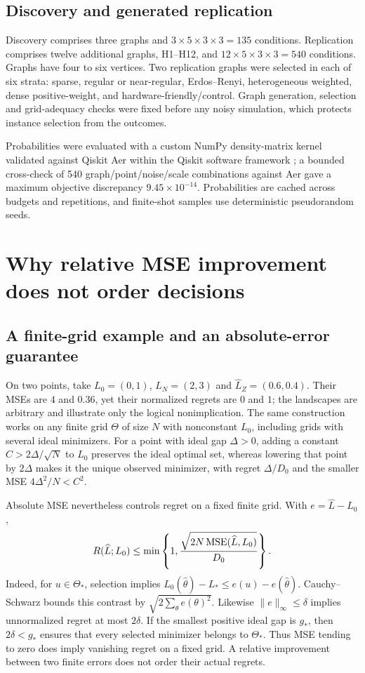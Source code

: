 \subsection{Discovery and generated replication}
Discovery comprises three graphs and $3\times5\times3\times3=135$ conditions. Replication comprises twelve additional graphs, H1--H12, and $12\times5\times3\times3=540$ conditions. Graphs have four to six vertices. Two replication graphs were selected in each of six strata: sparse, regular or near-regular, Erdos--Renyi, heterogeneous weighted, dense positive-weight, and hardware-friendly/control. Graph generation, selection and grid-adequacy checks were fixed before any noisy simulation, which protects instance selection from the outcomes.

Probabilities were evaluated with a custom NumPy density-matrix kernel validated against Qiskit Aer within the Qiskit software framework \citep{JavadiAbhari2024}; a bounded cross-check of 540 graph/point/noise/scale combinations against Aer gave a maximum objective discrepancy $9.45\times10^{-14}$. Probabilities are cached across budgets and repetitions, and finite-shot samples use deterministic pseudorandom seeds.

\section{Why relative MSE improvement does not order decisions}\label{sec:mse_decisions}
\subsection{A finite-grid example and an absolute-error guarantee}\label{sec:nonimplication}
On two points, take $L_0=(0,1)$, $\widehat L_N=(2,3)$ and $\widehat L_Z=(0.6,0.4)$. Their MSEs are $4$ and $0.36$, yet their normalized regrets are $0$ and $1$; the landscapes are arbitrary and illustrate only the logical nonimplication. The same construction works on any finite grid $\Theta$ of size $N$ with nonconstant $L_0$, including grids with several ideal minimizers. For a point with ideal gap $\Delta>0$, adding a constant $C>2\Delta/\sqrt N$ to $L_0$ preserves the ideal optimal set, whereas lowering that point by $2\Delta$ makes it the unique observed minimizer, with regret $\Delta/D_0$ and the smaller MSE $4\Delta^2/N<C^2$.

Absolute MSE nevertheless controls regret on a fixed finite grid. With $e=\widehat L-L_0$,
\begin{equation}
 R(\widehat L;L_0)\le\min\left\{1,\frac{\sqrt{2N\operatorname{MSE}(\widehat L,L_0)}}{D_0}\right\}.\label{eq:mse_bound}
\end{equation}
Indeed, for $u\in\Theta_*$, selection implies $L_0(\widehat\theta)-L_*\le e(u)-e(\widehat\theta)$. Cauchy--Schwarz bounds this contrast by $\sqrt{2\sum_\theta e(\theta)^2}$. Likewise $\|e\|_\infty\le\delta$ implies unnormalized regret at most $2\delta$. If the smallest positive ideal gap is $g_*$, then $2\delta<g_*$ ensures that every selected minimizer belongs to $\Theta_*$. Thus MSE tending to zero does imply vanishing regret on a fixed grid. A relative improvement between two finite errors does not order their actual regrets.

